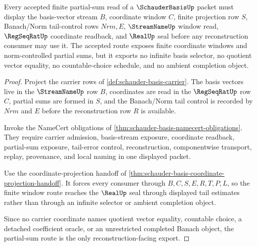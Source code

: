 \begin{theorem}
\label{thm:schauder-basis-partial-sum-cauchy-route}
Every accepted finite partial-sum read of a $\SchauderBasisUp$ packet must display the basis-vector stream $B$, coordinate window $C$, finite projection row $S$, Banach/Norm tail-control rows $Nrm,E$, $\StreamNameUp$ window read, $\RegSeqRatUp$ coordinate readback, and $\RealUp$ seal before any reconstruction consumer may use it. The accepted route exposes finite coordinate windows and norm-controlled partial sums, but it exports no infinite basis selector, no quotient vector equality, no countable-choice schedule, and no ambient completion object.
\end{theorem}
\begin{proof}
Project the carrier rows of \autoref{def:schauder-basis-carrier}. The basis vectors live in the $\StreamNameUp$ row $B$, coordinates are read in the $\RegSeqRatUp$ row $C$, partial sums are formed in $S$, and the Banach/Norm tail control is recorded by $Nrm$ and $E$ before the reconstruction row $R$ is available.

Invoke the NameCert obligations of \autoref{thm:schauder-basis-namecert-obligations}. They require carrier admission, basis-stream exposure, coordinate readback, partial-sum exposure, tail-error control, reconstruction, componentwise transport, replay, provenance, and local naming in one displayed packet.

Use the coordinate-projection handoff of \autoref{thm:schauder-basis-coordinate-projection-handoff}. It forces every consumer through $B,C,S,E,R,T,P,L$, so the finite window route reaches the $\RealUp$ seal through displayed tail estimates rather than through an infinite selector or ambient completion object.

Since no carrier coordinate names quotient vector equality, countable choice, a detached coefficient oracle, or an unrestricted completed Banach object, the partial-sum route is the only reconstruction-facing export.
\end{proof}



